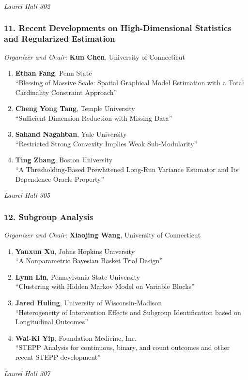 \emph{Laurel Hall 302} \\[.5em]

\subsubsection*{11. Recent Developments on High-Dimensional Statistics and Regularized Estimation}

\emph{Organizer and Chair:} \textbf{Kun Chen}, University of Connecticut

\begin{enumerate}
\item \textbf{Ethan Fang}, Penn State \\
``Blessing of Massive Scale: Spatial Graphical Model Estimation with a Total Cardinality Constraint Approach''
\item \textbf{Cheng Yong Tang}, Temple University \\
``Sufficient Dimension Reduction with Missing Data''
\item \textbf{Sahand Nagahban}, Yale University \\
``Restricted Strong Convexity Implies Weak Sub-Modularity''
\item \textbf{Ting Zhang}, Boston University \\
``A Thresholding-Based Prewhitened Long-Run Variance Estimator and Its Dependence-Oracle Property''
\end{enumerate}

\emph{Laurel Hall 305} \\[.5em]

\subsubsection*{12. Subgroup Analysis}

\emph{Organizer and Chair:} \textbf{Xiaojing Wang}, University of Connecticut

\begin{enumerate}
\item \textbf{Yanxun Xu}, Johns Hopkins University \\
``A Nonparametric Bayesian Basket Trial Design''
\item \textbf{Lynn Lin}, Pennsylvania State University \\
``Clustering with Hidden Markov Model on Variable Blocks''
\item \textbf{Jared Huling}, University of Wisconsin-Madison \\
``Heterogeneity of Intervention Effects and Subgroup Identification based on Longitudinal Outcomes''
\item \textbf{Wai-Ki Yip}, Foundation Medicine, Inc. \\
``STEPP Analysis for continuous, binary, and count outcomes and other recent STEPP development''
\end{enumerate}

\emph{Laurel Hall 307} \\[.5em]

